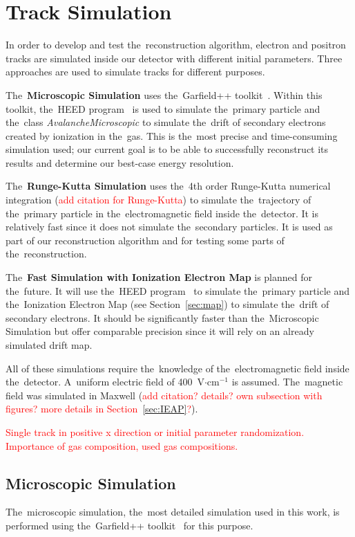 \chapter{Track Simulation}
	In order to develop and test the~reconstruction algorithm, electron and positron tracks are simulated inside our detector with different initial parameters. Three approaches are used to simulate tracks for different purposes.
	
	The~\textbf{Microscopic Simulation} uses the~Garfield++ toolkit~\cite{Garfield++}. Within this toolkit, the~\ac{HEED} program~\cite{HEED} is used to simulate the~primary particle and the~class \textit{AvalancheMicroscopic} to simulate the~drift of secondary electrons created by ionization in the~gas. This is the~most precise and time-consuming simulation used; our current goal is to be able to successfully reconstruct its results and determine our best-case energy resolution.
	
	The~\textbf{Runge-Kutta Simulation} uses the~4th order Runge-Kutta numerical integration (\textcolor{red}{add citation for Runge-Kutta}) to simulate the~trajectory of the~primary particle in the~electromagnetic field inside the~detector. It is relatively fast since it does not simulate the~secondary particles. It is used as part of our reconstruction algorithm and for testing some parts of the~reconstruction.
	
	The~\textbf{Fast Simulation with Ionization Electron Map} is planned for the~future. It will use the~\ac{HEED} program~\cite{HEED} to simulate the~primary particle and the~Ionization Electron Map (see Section~\ref{sec:map}) to simulate the~drift of secondary electrons. It should be significantly faster than the~Microscopic Simulation but offer comparable precision since it will rely on an already simulated drift map.
	
	All of these simulations require the~knowledge of the~electromagnetic field inside the~detector. A~uniform electric field of 400~V$\cdot$cm$^{-1}$ is assumed. The~magnetic field was simulated in Maxwell (\textcolor{red}{add citation? details? own subsection with figures? more details in Section~\ref{sec:IEAP}?}).
	
	\textcolor{red}{Single track in positive x direction or initial parameter randomization. Importance of gas composition, used gas compositions.}
	
	\section{Microscopic Simulation}
	\label{sec:microsim}
		The~microscopic simulation, the~most detailed simulation used in this work, is performed using the~Garfield++ toolkit~\cite{Garfield++} for this purpose. 
		
